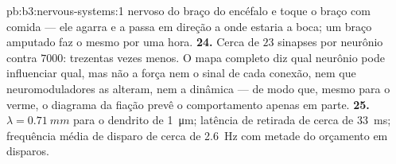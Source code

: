 \begin{solution}{pb:b3:nervous-systems:1}
nervoso do braço do encéfalo e toque o braço com comida --- ele agarra e
a passa em direção a onde estaria a boca; um braço amputado faz o mesmo
por uma hora.
\textbf{24.} Cerca de $23$ sinapses por neurônio contra $7000$:
trezentas vezes menos. O mapa completo diz qual neurônio pode influenciar
qual, mas não a força nem o sinal de cada conexão, nem que
neuromoduladores as alteram, nem a dinâmica --- de modo que, mesmo para o
verme, o diagrama da fiação prevê o comportamento apenas em parte.
\textbf{25.} $\lambda = \qty{0.71}{mm}$ para o dendrito de
\qty{1}{\micro m}; latência de retirada de cerca de \qty{33}{ms};
frequência média de disparo de cerca de \qty{2.6}{Hz} com metade do
orçamento em disparos.
\end{solution}
